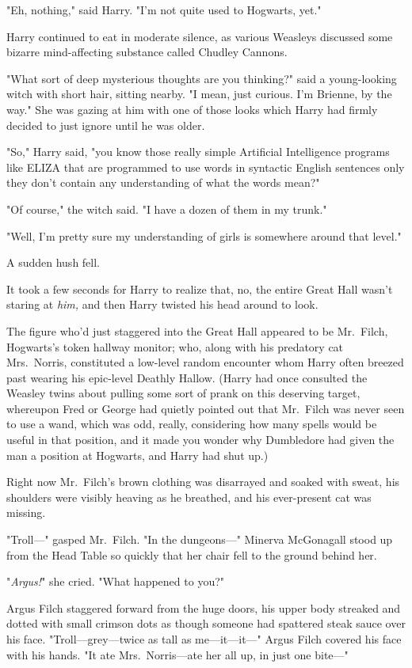 "Eh, nothing," said Harry. "I'm not quite used to Hogwarts, yet."

Harry continued to eat in moderate silence, as various Weasleys discussed some
bizarre mind-affecting substance called Chudley Cannons.

"What sort of deep mysterious thoughts are you thinking?" said a young-looking
witch with short hair, sitting nearby. "I mean, just curious. I'm Brienne, by
the way." She was gazing at him with one of those looks which Harry had firmly
decided to just ignore until he was older.

"So," Harry said, "you know those really simple Artificial Intelligence
programs like ELIZA that are programmed to use words in syntactic English
sentences only they don't contain any understanding of what the words mean?"

"Of course," the witch said. "I have a dozen of them in my trunk."

"Well, I'm pretty sure my understanding of girls is somewhere around that
level."

A sudden hush fell.

It took a few seconds for Harry to realize that, no, the entire Great Hall
wasn't staring at \emph{him,} and then Harry twisted his head around to look.

The figure who'd just staggered into the Great Hall appeared to be Mr.~Filch,
Hogwarts's token hallway monitor; who, along with his predatory cat
Mrs.~Norris, constituted a low-level random encounter whom Harry often breezed
past wearing his epic-level Deathly Hallow. (Harry had once consulted the
Weasley twins about pulling some sort of prank on this deserving target,
whereupon Fred or George had quietly pointed out that Mr.~Filch was never seen
to use a wand, which was odd, really, considering how many spells would be
useful in that position, and it made you wonder why Dumbledore had given the
man a position at Hogwarts, and Harry had shut up.)

Right now Mr.~Filch's brown clothing was disarrayed and soaked with sweat, his
shoulders were visibly heaving as he breathed, and his ever-present cat was
missing.

"Troll—" gasped Mr.~Filch. "In the dungeons—"
\sbreak
Minerva McGonagall stood up from the Head Table so quickly that her chair fell
to the ground behind her.

"\emph{Argus!}" she cried. "What happened to you?"

Argus Filch staggered forward from the huge doors, his upper body streaked and
dotted with small crimson dots as though someone had spattered steak sauce over
his face. "Troll—grey—twice as tall as me—it—it—" Argus Filch covered
his face with his hands. "It ate Mrs.~Norris—ate her all up, in just one
bite—"

